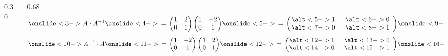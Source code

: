 \documentclass[aspectratio=169]{beamer}
\newcommand{\matriuIprogressiva}[4]{%
  \begin{pmatrix}
    \alt<#1-> {1} {\phantom{1}} & \alt<#2-> {0} {\phantom{0}} \\
    \alt<#3-> {0} {\phantom{0}} & \alt<#4-> {1} {\phantom{1}}
  \end{pmatrix}%
}
\begin{document}
\begin{frame}[t]
  \vspace{0.04cm}
  \begin{columns}[T,onlytextwidth]
    \begin{column}{0.30\textwidth}
    \end{column}
    \begin{column}{0.68\textwidth}
      {\small
      \[
        \onslide<3->{A \cdot A^{-1}}
        \onslide<4->{\,=\,
          \begin{pmatrix} 1 & 2 \\ 0 & 1 \end{pmatrix}
          \begin{pmatrix} 1 & -2 \\ 0 & 1 \end{pmatrix}}
        \onslide<5->{\,=\, \matriuIprogressiva{5}{6}{7}{8}}
        \onslide<9->{= I_2}
      \]
      \[
        \onslide<10->{A^{-1} \cdot A}
        \onslide<11->{\,=\,
          \begin{pmatrix} 1 & -2 \\ 0 & 1 \end{pmatrix}
          \begin{pmatrix} 1 & 2 \\ 0 & 1 \end{pmatrix}}
        \onslide<12->{\,=\, \matriuIprogressiva{12}{13}{14}{15}}
        \onslide<16->{= I_2}
      \]
      }
    \end{column}
  \end{columns}
\end{frame}
\end{document}
